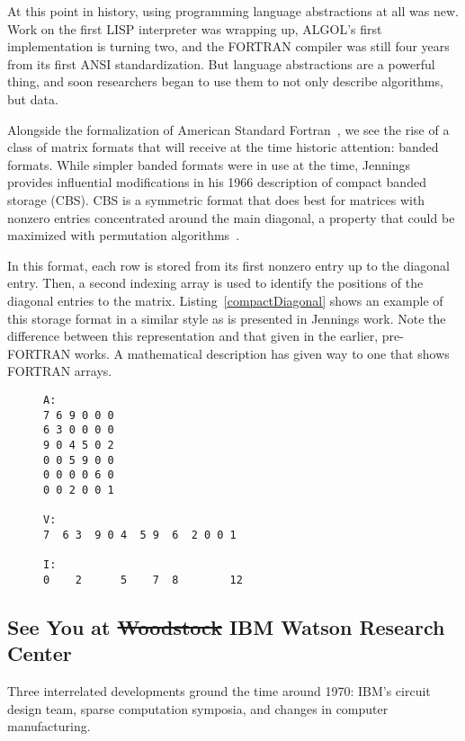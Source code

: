 At this point in history, using programming language abstractions at all was new. 
Work on the first LISP interpreter was wrapping up\cite{mccarthy1978history}, ALGOL's first implementation is turning two\cite{proof}, and the FORTRAN compiler was still four years from its first ANSI standardization\cite{proof}. 
But language abstractions are a powerful thing, and soon researchers began to use them to not only describe algorithms, but data.

Alongside the formalization of American Standard Fortran~\cite{ansi1966fortran}, we see the rise of a class of matrix formats that will receive at the time historic attention: banded formats.
While simpler banded formats were in use at the time, Jennings~\cite{jennings1966compact} provides influential modifications in his 1966 description of compact banded storage (CBS).
CBS is a symmetric format that does best for matrices with nonzero entries concentrated around the main diagonal, a property that could be maximized with permutation algorithms~\cite{alway1965algorithm}.

In this format, each row is stored from its first nonzero entry up to the diagonal entry. 
Then, a second indexing array is used to identify the positions of the diagonal entries to the matrix.
Listing~\ref{compactDiagonal} shows an example of this storage format in a similar style as is presented in Jennings work.
Note the difference between this representation and that given in the earlier, pre-FORTRAN works. 
A mathematical description has given way to one that shows FORTRAN arrays. 


\begin{figure}
\begin{lstlisting}[caption={A symmetric matrix and its compact diagonal storage representation},label={compactDiagonal}]
A:
7 6 9 0 0 0
6 3 0 0 0 0
9 0 4 5 0 2
0 0 5 9 0 0
0 0 0 0 6 0
0 0 2 0 0 1

V:
7  6 3  9 0 4  5 9  6  2 0 0 1

I:
0    2      5    7  8        12
\end{lstlisting}
\end{figure}



\subsection{See You at \sout{Woodstock} IBM Watson Research Center}

Three interrelated developments ground the time around 1970: IBM's circuit design team, sparse computation symposia, and changes in computer manufacturing. 

